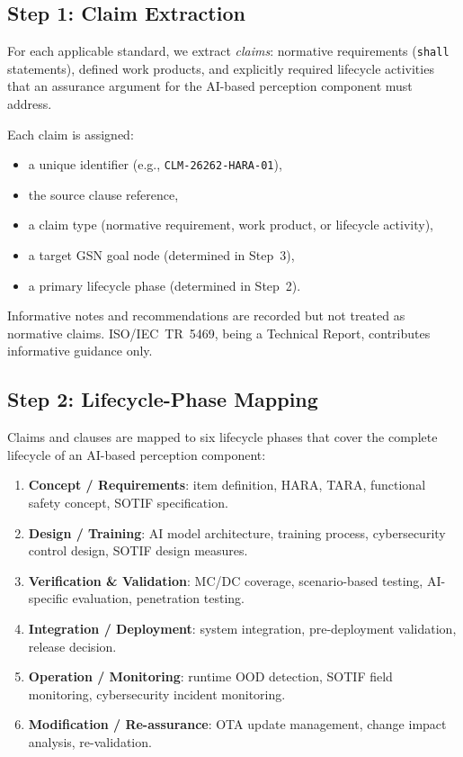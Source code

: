 \subsection{Step 1: Claim Extraction}\label{sec:step1}

For each applicable standard, we extract \emph{claims}: normative
requirements (\texttt{shall} statements), defined work products, and
explicitly required lifecycle activities that an assurance argument for
the AI-based perception component must address.

Each claim is assigned:
\begin{itemize}
    \item a unique identifier (e.g., \texttt{CLM-26262-HARA-01}),
    \item the source clause reference,
    \item a claim type (normative requirement, work product, or lifecycle activity),
    \item a target GSN goal node (determined in Step~3),
    \item a primary lifecycle phase (determined in Step~2).
\end{itemize}

Informative notes and recommendations are recorded but not treated as
normative claims. ISO/IEC~TR~5469, being a Technical Report, contributes
informative guidance only.

\subsection{Step 2: Lifecycle-Phase Mapping}\label{sec:step2}

Claims and clauses are mapped to six lifecycle phases that cover the
complete lifecycle of an AI-based perception component:
\begin{enumerate}
    \item \textbf{Concept / Requirements}: item definition, HARA, TARA,
          functional safety concept, SOTIF specification.
    \item \textbf{Design / Training}: AI model architecture, training process,
          cybersecurity control design, SOTIF design measures.
    \item \textbf{Verification \& Validation}: MC/DC coverage, scenario-based
          testing, AI-specific evaluation, penetration testing.
    \item \textbf{Integration / Deployment}: system integration, pre-deployment
          validation, release decision.
    \item \textbf{Operation / Monitoring}: runtime OOD detection, SOTIF field
          monitoring, cybersecurity incident monitoring.
    \item \textbf{Modification / Re-assurance}: OTA update management,
          change impact analysis, re-validation.
\end{enumerate}

